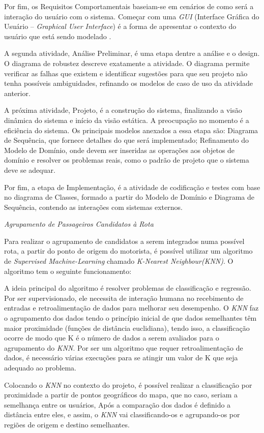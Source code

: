 Por fim, os Requisitos Comportamentais baseiam-se em cenários de como será a interação do usuário com o sistema. Começar com uma \emph{GUI} (Interface Gráfica do Usuário -- \emph{Graphical User Interface}) é a forma de apresentar o contexto do usuário que está sendo modelado \cite{iconixuml}.

A segunda atividade, Análise Preliminar, é uma etapa dentre a análise e o design. O diagrama de robustez descreve exatamente a atividade. O diagrama permite verificar as falhas que existem e identificar sugestões para que seu projeto não tenha possíveis ambiguidades, refinando os modelos de caso de uso da atividade anterior.

A próxima atividade, Projeto, é a construção do sistema, finalizando a visão dinâmica do sistema e início da visão estática. A preocupação no momento é a eficiência do sistema. Os principais modelos anexados a essa etapa são: Diagrama de Sequência, que fornece detalhes do que será implementado; Refinamento do Modelo de Domínio, onde devem ser inseridas as operações aos objetos de domínio e resolver os problemas reais, como o padrão de projeto que o sistema deve se adequar.

Por fim, a etapa de Implementação, é a atividade de codificação e testes com base no diagrama de Classes, formado a partir do Modelo de Domínio e Diagrama de Sequência, contendo as interações com sistemas externos.

\emph{Agrupamento de Passageiros Candidatos à Rota}

Para realizar o agrupamento de candidatos a serem integrados numa possível rota, a partir do ponto de origem do motorista, é possível utilizar um algoritmo de \emph{Supervised Machine-Learning} chamado \emph{K-Nearest Neighbour(KNN)}. O algoritmo tem o seguinte funcionamento:

A ideia principal do algoritmo é resolver problemas de classificação e regressão. Por ser supervisionado, ele necessita de interação humana no recebimento de entradas e retroalimentação de dados para melhorar seu desempenho. O \emph{KNN} faz o agrupamento dos dados tendo o princípio inicial de que dados semelhantes têm maior proximidade (funções de distância euclidiana), tendo isso, a classificação ocorre de modo que K é o número de dados a serem avaliados para o agrupamento do \emph{KNN}. Por ser um algoritmo que requer retroalimentação de dados, é necessário várias execuções para se atingir um valor de K que seja adequado ao problema.

Colocando o \emph{KNN} no contexto do projeto, é possível realizar a classificação por  proximidade a partir de pontos geográficos do mapa, que no caso, seriam a semelhança entre os usuários, Após a comparação dos dados é definido a distância  entre eles, e assim, o \emph{KNN} vai classificando-os e agrupando-os por regiões de origem e destino semelhantes. 

